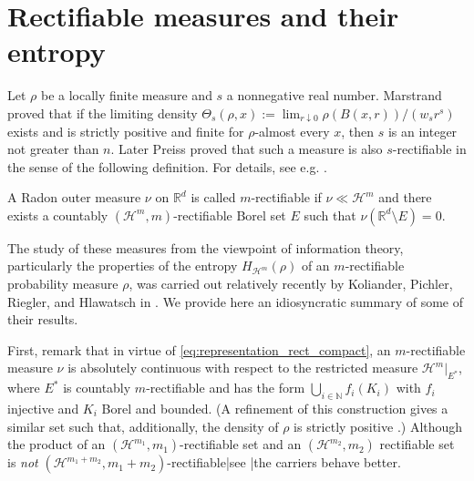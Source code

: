\documentclass[runningheads]{llncs}
\newcommand{\salg}[1]{\mathfrak {#1}}
\newcommand{\Rr}{\mathbb{R}}
\newcommand{\Nn}{\mathbb{N}}
\newcommand{\mres}{\mathbin{\vrule height 1.6ex depth 0pt width
0.13ex\vrule height 0.13ex depth 0pt width 1.3ex}}
\begin{document}
\section{Rectifiable measures and their entropy}

Let $\rho$ be a locally finite measure and $s$ a nonnegative real number. 
Marstrand proved that if the limiting density $
\Theta_s(\rho,x) := 
\lim_{r\downarrow 0} \rho(B(x,r))/(w_s r^s)$
exists and is strictly positive and finite for $\rho$-almost every $x$, then $s$ is an integer not greater than $n$. Later Preiss proved that such a measure is also $s$-rectifiable in the sense of the following definition. For details, see e.g. \cite{DeLellis2008}.



\begin{definition}\label{def:rectifiable_measure} A Radon outer measure $\nu$ on $\Rr^d$ is called $m$-rectifiable if $\nu \ll \mathcal H^m$ and there exists a countably $(\mathcal H^m,m)$-rectifiable Borel set $E$ such that $\nu(\Rr^d\setminus E)=0$.
\end{definition}

The study of these measures from the viewpoint of information theory, particularly the properties of the entropy $H_{\mathcal H^m}(\rho)$ of an $m$-rectifiable probability measure $\rho$, was carried out relatively recently by Koliander, Pichler, Riegler, and Hlawatsch in \cite{Koliander2016}. We provide here an idiosyncratic summary of some of their results. 

First, remark that in virtue of \eqref{eq:representation_rect_compact},  an $m$-rectifiable measure $\nu$ is absolutely continuous with respect to the restricted measure $\mathcal H^m |_{E^*}$, where $E^*$ is countably $m$-rectifiable and has the form $\bigcup_{i\in \Nn} f_i(K_i)$ with $f_i$ injective and $K_i$ Borel and bounded. %
 (A refinement of this construction gives a similar set such that, additionally, the density of $\rho$ is strictly positive \cite[App.~A]{Koliander2016}.) Although the product of an $(\mathcal H^{m_1},m_1)$-rectifiable set and an $(\mathcal H^{m_2},m_2)$ rectifiable set is \emph{not} $(\mathcal H^{m_1+m_2},m_1+m_2)$-rectifiable|see \cite[3.2.24]{Federer1969}|the carriers behave better.  
\end{document}
